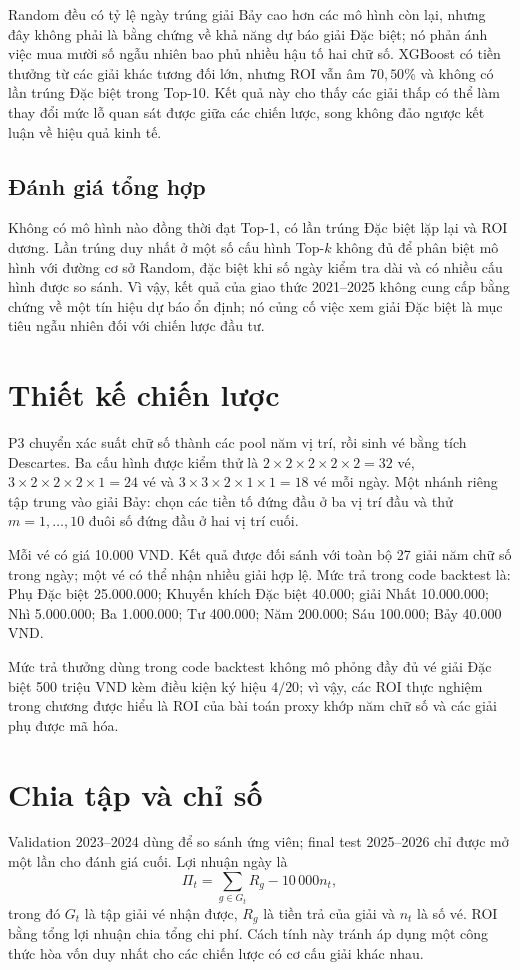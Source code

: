Random đều có tỷ lệ ngày trúng giải Bảy cao hơn các mô hình còn lại, nhưng đây không phải là bằng chứng về khả năng dự báo giải Đặc biệt; nó phản ánh việc mua mười số ngẫu nhiên bao phủ nhiều hậu tố hai chữ số. XGBoost có tiền thưởng từ các giải khác tương đối lớn, nhưng ROI vẫn âm $70,50\%$ và không có lần trúng Đặc biệt trong Top-10. Kết quả này cho thấy các giải thấp có thể làm thay đổi mức lỗ quan sát được giữa các chiến lược, song không đảo ngược kết luận về hiệu quả kinh tế.

\subsection{Đánh giá tổng hợp}
Không có mô hình nào đồng thời đạt Top-1, có lần trúng Đặc biệt lặp lại và ROI dương. Lần trúng duy nhất ở một số cấu hình Top-$k$ không đủ để phân biệt mô hình với đường cơ sở Random, đặc biệt khi số ngày kiểm tra dài và có nhiều cấu hình được so sánh. Vì vậy, kết quả của giao thức 2021--2025 không cung cấp bằng chứng về một tín hiệu dự báo ổn định; nó củng cố việc xem giải Đặc biệt là mục tiêu ngẫu nhiên đối với chiến lược đầu tư.
\section{Thiết kế chiến lược}
P3 chuyển xác suất chữ số thành các pool năm vị trí, rồi sinh vé bằng tích Descartes. Ba cấu hình được kiểm thử là $2\times2\times2\times2\times2=32$ vé, $3\times2\times2\times2\times1=24$ vé và $3\times3\times2\times1\times1=18$ vé mỗi ngày. Một nhánh riêng tập trung vào giải Bảy: chọn các tiền tố đứng đầu ở ba vị trí đầu và thử $m=1,\ldots,10$ đuôi số đứng đầu ở hai vị trí cuối.

Mỗi vé có giá 10.000 VND. Kết quả được đối sánh với toàn bộ 27 giải năm chữ số trong ngày; một vé có thể nhận nhiều giải hợp lệ. Mức trả trong code backtest là: Phụ Đặc biệt 25.000.000; Khuyến khích Đặc biệt 40.000; giải Nhất 10.000.000; Nhì 5.000.000; Ba 1.000.000; Tư 400.000; Năm 200.000; Sáu 100.000; Bảy 40.000 VND.

Mức trả thưởng dùng trong code backtest không mô phỏng đầy đủ vé giải Đặc biệt 500 triệu VND kèm điều kiện ký hiệu $4/20$; vì vậy, các ROI thực nghiệm trong chương được hiểu là ROI của bài toán proxy khớp năm chữ số và các giải phụ được mã hóa.

\section{Chia tập và chỉ số}
Validation 2023--2024 dùng để so sánh ứng viên; final test 2025--2026 chỉ được mở một lần cho đánh giá cuối. Lợi nhuận ngày là
\[
\Pi_t=\sum_{g\in G_t}R_g-10\,000 n_t,
\]
trong đó $G_t$ là tập giải vé nhận được, $R_g$ là tiền trả của giải và $n_t$ là số vé. ROI bằng tổng lợi nhuận chia tổng chi phí. Cách tính này tránh áp dụng một công thức hòa vốn duy nhất cho các chiến lược có cơ cấu giải khác nhau.

